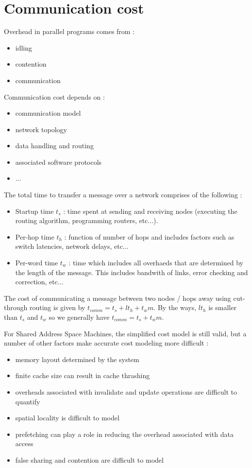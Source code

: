 \documentclass[11pt,a4paper]{report}
\begin{document}

\section{Communication cost} %
\label{sec:Communication cost}

Overhead in parallel programs comes from :
\begin{itemize}
    \item idling
    \item contention
    \item communication
\end{itemize}

Communication cost depends on :
\begin{itemize}
    \item communication model
    \item network topology
    \item data handling and routing
    \item associated software protocols
    \item ...
\end{itemize}

The total time to transfer a message over a network comprises of the following :
\begin{itemize}
    \item Startup time $t_s$ : time spent at sending and receiving nodes (executing the routing algorithm, programming routers, etc...).
    \item Per-hop time $t_h$ : function of number of hops and includes factors such as switch latencies, network delays, etc...
    \item Per-word time $t_w$ : time which includes all overhaeds that are determined by the length of the message. This includes bandwith of links, error checking and correction, etc...
\end{itemize}

The cost of communicating a message between two nodes / hops away using cut-through routing is given by $t_{comm} = t_s + lt_h + t_wm$. By the ways, $lt_h$ is smaller than $t_s$ and $t_w$ so we generally have $t_{comm} = t_s + t_wm$.

For Shared Address Space Machines, the simplified cost model is still valid, but a number of other factors make accurate cost modeling more difficult :
\begin{itemize}
    \item memory layout determined by the system
    \item finite cache size can result in cache thrashing
    \item overheads associated with invalidate and update operations are difficult to quantify
    \item spatial locality is difficult to model
    \item prefetching can play a role in reducing the overhead associated with data access
    \item false sharing and contention are difficult to model
\end{itemize}
\end{document}
